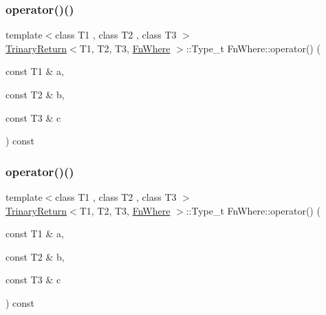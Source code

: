 \subsubsection{\texorpdfstring{operator()()}{operator()()}\hspace{0.1cm}{\footnotesize\ttfamily [1/3]}}
{\footnotesize\ttfamily template$<$class T1 , class T2 , class T3 $>$ \\
\mbox{\hyperlink{structTrinaryReturn}{Trinary\+Return}}$<$T1, T2, T3, \mbox{\hyperlink{structFnWhere}{Fn\+Where}} $>$\+::Type\+\_\+t Fn\+Where\+::operator() (\begin{DoxyParamCaption}\item[{const T1 \&}]{a,  }\item[{const T2 \&}]{b,  }\item[{const T3 \&}]{c }\end{DoxyParamCaption}) const\hspace{0.3cm}{\ttfamily [inline]}}

\mbox{\label{structFnWhere_ad37f5c32c5ad4b8288a595841b16e178}} 
\subsubsection{\texorpdfstring{operator()()}{operator()()}\hspace{0.1cm}{\footnotesize\ttfamily [2/3]}}
{\footnotesize\ttfamily template$<$class T1 , class T2 , class T3 $>$ \\
\mbox{\hyperlink{structTrinaryReturn}{Trinary\+Return}}$<$T1, T2, T3, \mbox{\hyperlink{structFnWhere}{Fn\+Where}} $>$\+::Type\+\_\+t Fn\+Where\+::operator() (\begin{DoxyParamCaption}\item[{const T1 \&}]{a,  }\item[{const T2 \&}]{b,  }\item[{const T3 \&}]{c }\end{DoxyParamCaption}) const\hspace{0.3cm}{\ttfamily [inline]}}

\mbox{\label{structFnWhere_ad37f5c32c5ad4b8288a595841b16e178}} 
